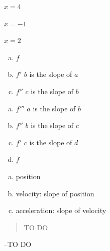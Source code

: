 \documentclass[letterpaper, landscape]{exam}
\begin{document}
\begin{description}
      \item[36] $x = 4$

      \item[37] 
        \begin{itemize*}
          \item $x = -1$
          \item $x = 2$
        \end{itemize*}

      \item[41] 
        \begin{enumerate}[(a)]
          \item $f$
          \item $f'$ $b$ is the slope of $a$
          \item $f''$ $c$ is the slope of $b$
        \end{enumerate}

      \item[42] 
        \begin{enumerate}[(a)]
          \item $f'''$ $a$ is the slope of $b$
          \item $f''$ $b$ is the slope of $c$
          \item $f'$ $c$ is the slope of $d$
          \item $f$ 
        \end{enumerate}

      \item
        \begin{enumerate}[(a)]
          \item position
          \item velocity: slope of position
          \item acceleration: slope of velocity
        \end{enumerate}
     \end{description}
 
 
  \else
    \vspace{10 cm}
    \begin{quote}
      \begin{em}
        TO DO
      \end{em}
    \end{quote}
    \hspace{2 cm} --TO DO
  \fi
\end{document}
